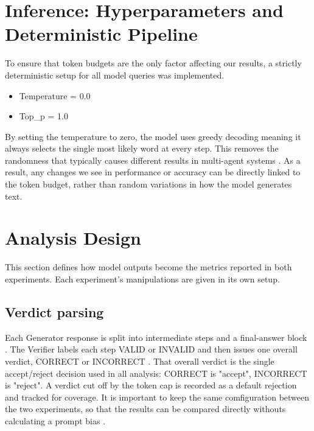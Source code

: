 \documentclass[12pt, a4paper, oneside]{report}
\begin{document}
\section{Inference: Hyperparameters and Deterministic Pipeline}
To ensure that token budgets are the only factor affecting our results, a strictly deterministic setup for all model queries was implemented.
\begin{itemize}
    \item Temperature = 0.0
    \item Top\_p = 1.0
\end{itemize}
By setting the temperature to zero, the model uses greedy decoding meaning it always selects the single most likely word at every step. This removes the randomness that typically causes different results in multi-agent systems \parencite{Ren2025, Wu2025}. As a result, any changes we see in performance or accuracy can be directly linked to the token budget, rather than random variations in how the model generates text.

\section{Analysis Design}
This section defines how model outputs become the metrics reported in both experiments. Each experiment's manipulations are given in its own setup.

\subsection{Verdict parsing}
Each Generator response is split into intermediate steps and a final-answer block \parencite{Khalifa2025}. 
The Verifier labels each step VALID or INVALID and then issues one overall verdict, 
CORRECT or INCORRECT \parencite{Khalifa2025}. That overall verdict is the single accept/reject decision used
in all analysis: CORRECT is "accept", INCORRECT is "reject". A verdict cut off by the
token cap is recorded as a default rejection and tracked for coverage. It is important to keep the same 
comfiguration between the two experiments, so that the results can be compared directly withouts calculating
a prompt bias \parencite{Zhao2026}.
\end{document}
